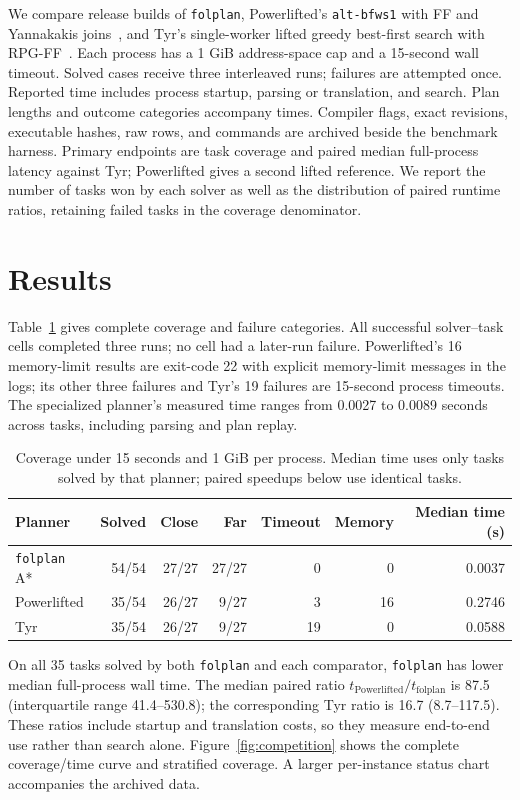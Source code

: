 \documentclass[10pt,a4paper]{article}
\begin{document}
We compare release builds of \texttt{folplan}, Powerlifted's
\texttt{alt-bfws1} with FF and Yannakakis joins~\cite{powerlifted}, and
Tyr's single-worker lifted greedy best-first search with RPG-FF~\cite{tyr}.
Each process has a 1 GiB address-space cap and a 15-second wall timeout.
Solved cases receive three interleaved runs; failures are attempted once.
Reported time includes process startup, parsing or translation, and search.
Plan lengths and outcome categories accompany times. Compiler flags, exact
revisions, executable hashes, raw rows, and commands are archived beside
the benchmark harness.
Primary endpoints are task coverage and paired median full-process latency
against Tyr; Powerlifted gives a second lifted reference. We report the
number of tasks won by each solver as well as the distribution of paired
runtime ratios, retaining failed tasks in the coverage denominator.

\section{Results}
Table~\ref{tab:coverage} gives complete coverage and failure categories. All
successful solver--task cells completed three runs; no cell had a later-run
failure. Powerlifted's 16 memory-limit results are exit-code 22 with explicit
memory-limit messages in the logs; its other three failures and Tyr's 19
failures are 15-second process timeouts. The specialized planner's measured
time ranges from 0.0027 to 0.0089 seconds across tasks, including parsing and
plan replay.

\begin{table}[H]
\centering
\caption{Coverage under 15 seconds and 1 GiB per process. Median time uses
only tasks solved by that planner; paired speedups below use identical tasks.}
\label{tab:coverage}
\begin{tabular}{lrrrrrr}
\toprule
Planner & Solved & Close & Far & Timeout & Memory & Median time (s) \\
\midrule
\texttt{folplan} A* & 54/54 & 27/27 & 27/27 & 0 & 0 & 0.0037 \\
Powerlifted & 35/54 & 26/27 & 9/27 & 3 & 16 & 0.2746 \\
Tyr & 35/54 & 26/27 & 9/27 & 19 & 0 & 0.0588 \\
\bottomrule
\end{tabular}
\end{table}

On all 35 tasks solved by both \texttt{folplan} and each comparator,
\texttt{folplan} has lower median full-process wall time. The median paired
ratio $t_{\mathrm{Powerlifted}}/t_{\mathrm{folplan}}$ is 87.5
(interquartile range 41.4--530.8); the corresponding Tyr ratio is 16.7
(8.7--117.5). These ratios include startup and translation costs, so they
measure end-to-end use rather than search alone. Figure~\ref{fig:competition}
shows the complete coverage/time curve and stratified coverage. A larger
per-instance status chart accompanies the archived data.
\end{document}
